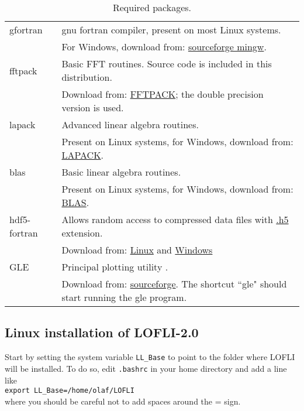 \begin{table}[!ht]
\caption{Required packages. }
\begin{tabular}{|l p{14cm}|}
\hline
gfortran & gnu fortran compiler, present on most Linux systems.\\
& For Windows, download from: \href{https://sourceforge.net/projects/mingw/}{sourceforge mingw}.
\\fftpack & Basic FFT routines.  Source code is included in this distribution.\\
& Download from: \href{http://www.netlib.org/fftpack/}{FFTPACK}; the double precision version is used.
\\lapack & Advanced linear algebra routines.\\
& Present on Linux systems, for Windows, download from: \href{https://www.netlib.org/lapack/}{LAPACK}.
\\blas & Basic linear algebra routines.\\
& Present on Linux systems, for Windows, download from: \href{https://www.netlib.org/blas/}{BLAS}.
\\hdf5-fortran & Allows random access to compressed data files with \href{https://portal.hdfgroup.org/display/support}{.h5} extension.\\
& Download from: \href{https://www.hdfgroup.org/downloads/hdf5/}{Linux} and \href{https://support.hdfgroup.org/ftp/HDF5/releases/hdf5-1.6/hdf5-1.6.7/src/unpacked/release_docs/INSTALL_Windows.txt}{Windows}
\\
GLE & Principal plotting utility \cite{GLE}.\\
& Download from: \href{https://glx.sourceforge.io/index.html}{sourceforge}. The shortcut ``gle" should start running the gle program.
\\\hline
\end{tabular}
\end{table}
\clearpage

\subsection{Linux installation of LOFLI-2.0}

Start by setting the system variable {\small \verb!LL_Base! } to point to the folder where LOFLI will be installed. To do so, edit {\small \verb!.bashrc! } in your home directory and add a line like\\
{\small \verb!export LL_Base=/home/olaf/LOFLI! }\\
where you should be careful not to add spaces around the = sign.

